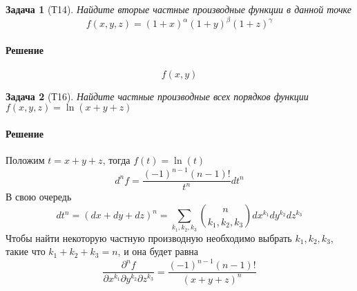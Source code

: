 \documentclass[a4paper,12pt]{report}
\newtheorem{problem}{Задача}[]
\newenvironment{sol}{\paragraph{Решение}}{}
\begin{document}
	
	\newpage
    
    \begin{problem}[Т14]
        Найдите вторые частные производные функции в данной точке
        \begin{equation*}
            f(x,y,z)=(1+x)^{\alpha}(1+y)^{\beta}(1+z)^{\gamma}
        \end{equation*}
    \end{problem}
    \begin{sol}
        \begin{equation}
            f(x,y)
        \end{equation}
    \end{sol}
	
    \begin{problem}[Т16]
        Найдите частные производные всех порядков функции $f(x,y,z)=\ln{(x+y+z)}$
    \end{problem}
    \begin{sol}
        Положим $t=x+y+z$, тогда $f(t)=\ln(t)$
        \begin{equation}
            d^nf=\frac{(-1)^{n-1}(n-1)!}{t^n}dt^n
        \end{equation}
        В свою очередь 
        \begin{equation}
            dt^n=(dx+dy+dz)^n=\displaystyle\sum_{k_1,k_2,k_3}^{}{n\choose k_1,k_2,k_3}dx^{k_1}dy^{k_2}dz^{k_3}
        \end{equation}
        Чтобы найти некоторую частную производную необходимо выбрать $k_1,k_2,k_3$, такие что $k_1+k_2+k_3=n$, и она будет равна
        \begin{equation}
            \frac{\partial^n f}{\partial x^{k_1}\partial y^{k_2}\partial z^{k_3}}=\frac{(-1)^{n-1}(n-1)!}{(x+y+z)^n}
        \end{equation}
    \end{sol}
    
\end{document}
